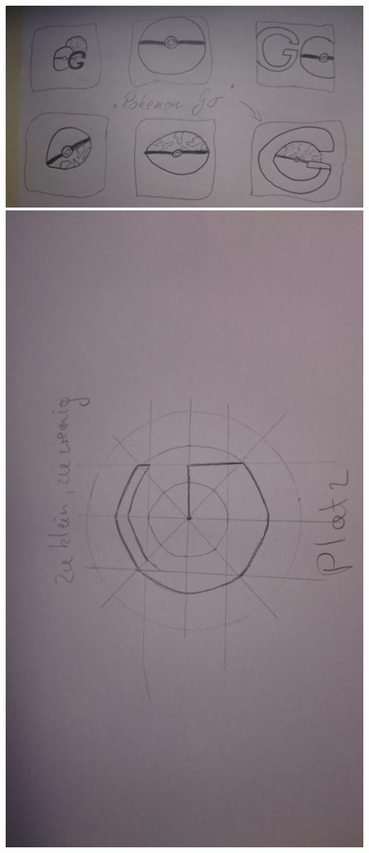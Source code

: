 \documentclass{article}
\begin{document}
 
\includegraphics[scale=0.13]{DSC_0758.jpg}
\includegraphics[scale=0.13]{DSC_0759.jpg}\\
\end{document}
